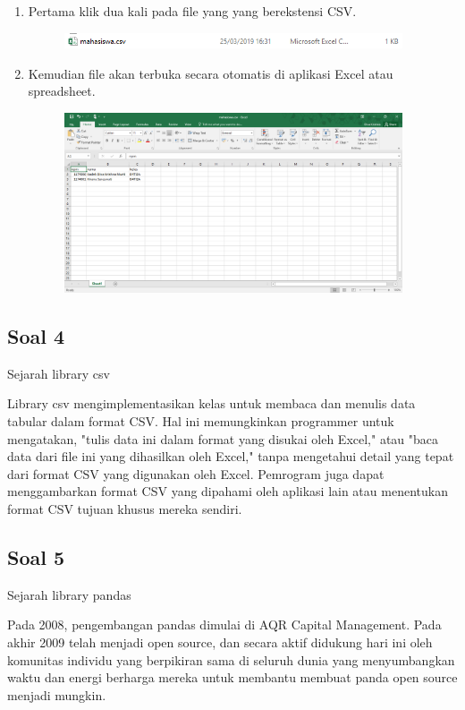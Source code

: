 \begin{enumerate}
	\item Pertama klik dua kali pada file yang yang berekstensi CSV.
	
	\begin{figure}[H]
		\includegraphics[width=10cm]{figures/4/1174006/Teori/t8.png}
		\centering
	\end{figure}
	
	\item Kemudian file akan terbuka secara otomatis di aplikasi Excel atau spreadsheet.
	
	\begin{figure}[H]
		\includegraphics[width=10cm]{figures/4/1174006/Teori/t9.png}
		\centering
	\end{figure}
\end{enumerate}

\subsection{Soal 4}
Sejarah library csv

Library csv mengimplementasikan kelas untuk membaca dan menulis data tabular dalam format CSV. Hal ini memungkinkan programmer untuk mengatakan, "tulis data ini dalam format yang disukai oleh Excel," atau "baca data dari file ini yang dihasilkan oleh Excel," tanpa mengetahui detail yang tepat dari format CSV yang digunakan oleh Excel. Pemrogram juga dapat menggambarkan format CSV yang dipahami oleh aplikasi lain atau menentukan format CSV tujuan khusus mereka sendiri.

\subsection{Soal 5}
Sejarah library pandas

Pada 2008, pengembangan pandas dimulai di AQR Capital Management. Pada akhir 2009 telah menjadi open source, dan secara aktif didukung hari ini oleh komunitas individu yang berpikiran sama di seluruh dunia yang menyumbangkan waktu dan energi berharga mereka untuk membantu membuat panda open source menjadi mungkin.

